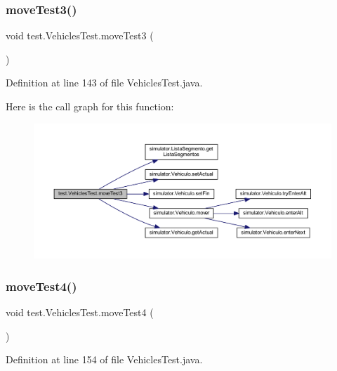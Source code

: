 \subsubsection{\texorpdfstring{move\+Test3()}{moveTest3()}}
{\footnotesize\ttfamily void test.\+Vehicles\+Test.\+move\+Test3 (\begin{DoxyParamCaption}{ }\end{DoxyParamCaption})}



Definition at line 143 of file Vehicles\+Test.\+java.

Here is the call graph for this function\+:\nopagebreak
\begin{figure}[H]
\begin{center}
\leavevmode
\includegraphics[width=350pt]{classtest_1_1_vehicles_test_ac6267ff4e71ba311e03c25de20196e65_cgraph}
\end{center}
\end{figure}
\mbox{\label{classtest_1_1_vehicles_test_acb2d255019e8718669cb5d6105fd43fa}} 
\subsubsection{\texorpdfstring{move\+Test4()}{moveTest4()}}
{\footnotesize\ttfamily void test.\+Vehicles\+Test.\+move\+Test4 (\begin{DoxyParamCaption}{ }\end{DoxyParamCaption})}



Definition at line 154 of file Vehicles\+Test.\+java.

